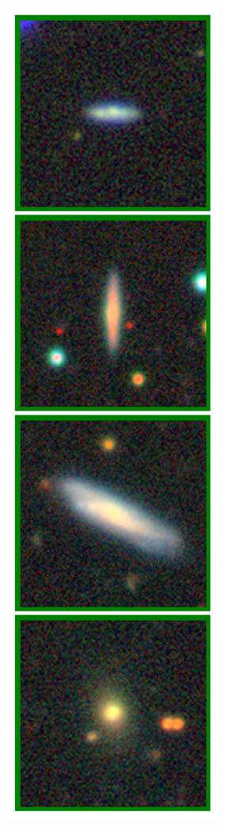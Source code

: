 \documentclass[a4paper,12pt]{article}
\begin{document}
\begin{figure}[H]
    \centering
    \begin{subfigure}{0.08\textwidth}
        \centering
        \includegraphics[height=0.21\textheight]{../figures/query_images.png}

\end{subfigure}
\end{figure}
\end{document}
